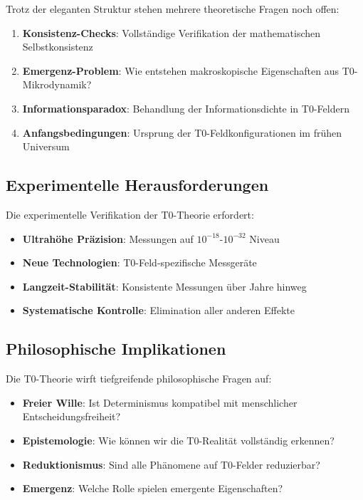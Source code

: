 	Trotz der eleganten Struktur stehen mehrere theoretische Fragen noch offen:
	
	\begin{enumerate}
		\item \textbf{Konsistenz-Checks}: Vollständige Verifikation der mathematischen Selbstkonsistenz
		\item \textbf{Emergenz-Problem}: Wie entstehen makroskopische Eigenschaften aus T0-Mikrodynamik?
		\item \textbf{Informationsparadox}: Behandlung der Informationsdichte in T0-Feldern
		\item \textbf{Anfangsbedingungen}: Ursprung der T0-Feldkonfigurationen im frühen Universum
	\end{enumerate}
	
	\subsection{Experimentelle Herausforderungen}
	
	Die experimentelle Verifikation der T0-Theorie erfordert:
	
	\begin{itemize}
		\item \textbf{Ultrahöhe Präzision}: Messungen auf $10^{-18}$-$10^{-32}$ Niveau
		\item \textbf{Neue Technologien}: T0-Feld-spezifische Messgeräte
		\item \textbf{Langzeit-Stabilität}: Konsistente Messungen über Jahre hinweg
		\item \textbf{Systematische Kontrolle}: Elimination aller anderen Effekte
	\end{itemize}
	
	\subsection{Philosophische Implikationen}
	
	Die T0-Theorie wirft tiefgreifende philosophische Fragen auf:
	
	\begin{itemize}
		\item \textbf{Freier Wille}: Ist Determinismus kompatibel mit menschlicher Entscheidungsfreiheit?
		\item \textbf{Epistemologie}: Wie können wir die T0-Realität vollständig erkennen?
		\item \textbf{Reduktionismus}: Sind alle Phänomene auf T0-Felder reduzierbar?
		\item \textbf{Emergenz}: Welche Rolle spielen emergente Eigenschaften?
	\end{itemize}
	